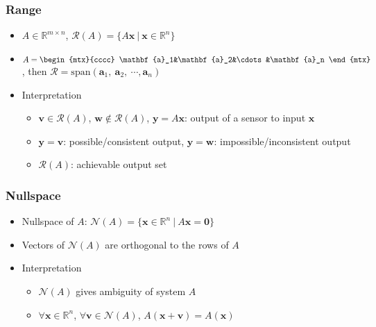 \subsubsection*{Range}
\begin{itemize}
    \item $A \in \mathbb{R}^{m\times n}$, $\mathcal{R}(A) = \{A\mathbf{x}~|~\mathbf{x}\in\mathbb{R}^n\}$
    \item $A = \begin{mtx}{cccc} \mathbf{a}_1&\mathbf{a}_2&\cdots&\mathbf{a}_n \end{mtx}$,
        then $\mathcal{R} = \mathrm{span}(\mathbf{a}_1,~\mathbf{a}_2,~\cdots,\mathbf{a}_n)$
    \item Interpretation
    \begin{itemize}
        \item $\mathbf{v} \in \mathcal{R}(A)$, $\mathbf{w} \notin \mathcal{R}(A)$, $\mathbf{y} = A\mathbf{x}$: output of a sensor to input $\mathbf{x}$
        \item $\mathbf{y} = \mathbf{v}$: possible/consistent output, $\mathbf{y} = \mathbf{w}$: impossible/inconsistent output
        \item $\mathcal{R}(A)$: achievable output set
    \end{itemize}
\end{itemize}

\subsubsection*{Nullspace}
\begin{itemize}
    \item Nullspace of $A$: $\mathcal{N}(A) = \{\mathbf{x} \in \mathbb{R}^n~|~A\mathbf{x} = \mathbf{0}\}$
    \item Vectors of $\mathcal{N}(A)$ are orthogonal to the rows of $A$
    \item Interpretation
    \begin{itemize}
        \item $\mathcal{N}(A)$ gives ambiguity of system $A$
        \item $\forall \mathbf{x} \in \mathbb{R}^n$, $\forall \mathbf{v} \in \mathcal{N}(A)$, $A(\mathbf{x} + \mathbf{v}) = A(\mathbf{x})$
    \end{itemize}
\end{itemize}

